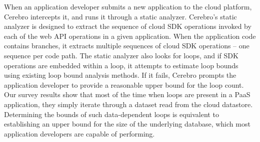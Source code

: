 When an application developer submits a new
application to the cloud platform, Cerebro intercepts it, and runs it through a static analyzer.
Cerebro's static analyzer is designed to extract the sequence of cloud SDK operations invoked by each
of the web API operations in a given application. When the application code contains branches, it
extracts multiple sequences of cloud SDK operations -- one sequence per code path. The static
analyzer also looks for loops, and if SDK operations are embedded within a loop, it attempts to
estimate loop bounds using existing loop bound analysis methods. If it fails, Cerebro prompts the 
application developer to provide a reasonable upper
bound for the loop count. Our survey results show that most of the time when loops are present in
a PaaS application, they simply iterate through a dataset read from the cloud datastore. 
Determining the bounds of such data-dependent loops is equivalent to establishing an upper bound
for the size of the underlying database, which most application developers are capable of performing.